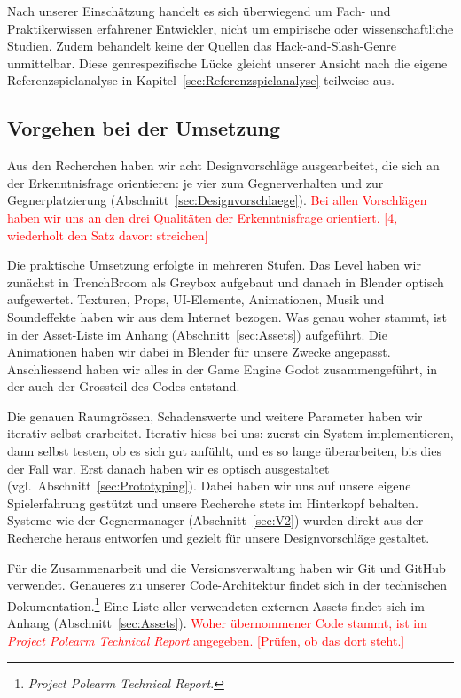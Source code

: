 \documentclass[../Main.tex]{subfiles}
\begin{document}
Nach unserer Einschätzung handelt es sich überwiegend um Fach- und Praktikerwissen erfahrener Entwickler, nicht um empirische oder wissenschaftliche Studien. Zudem behandelt keine der Quellen das Hack-and-Slash-Genre unmittelbar. Diese genrespezifische Lücke gleicht unserer Ansicht nach die eigene Referenzspielanalyse in Kapitel~\ref{sec:Referenzspielanalyse} teilweise aus.

\subsection{Vorgehen bei der Umsetzung} \label{sec:VorgehenUmsetzung}
Aus den Recherchen haben wir acht Designvorschläge ausgearbeitet, die sich an der Erkenntnisfrage orientieren: je vier zum Gegnerverhalten und zur Gegnerplatzierung (Abschnitt~\ref{sec:Designvorschlaege}). \textcolor{red}{Bei allen Vorschlägen haben wir uns an den drei Qualitäten der Erkenntnisfrage orientiert. [4, wiederholt den Satz davor: streichen]}

Die praktische Umsetzung erfolgte in mehreren Stufen. Das Level haben wir zunächst in TrenchBroom als Greybox aufgebaut und danach in Blender optisch aufgewertet. Texturen, Props, UI-Elemente, Animationen, Musik und Soundeffekte haben wir aus dem Internet bezogen. Was genau woher stammt, ist in der Asset-Liste im Anhang (Abschnitt~\ref{sec:Assets}) aufgeführt. Die Animationen haben wir dabei in Blender für unsere Zwecke angepasst. Anschliessend haben wir alles in der Game Engine Godot zusammengeführt, in der auch der Grossteil des Codes entstand.

Die genauen Raumgrössen, Schadenswerte und weitere Parameter haben wir iterativ selbst erarbeitet. Iterativ hiess bei uns: zuerst ein System implementieren, dann selbst testen, ob es sich gut anfühlt, und es so lange überarbeiten, bis dies der Fall war. Erst danach haben wir es optisch ausgestaltet (vgl.\ Abschnitt~\ref{sec:Prototyping}). Dabei haben wir uns auf unsere eigene Spielerfahrung gestützt und unsere Recherche stets im Hinterkopf behalten. Systeme wie der Gegnermanager (Abschnitt~\ref{sec:V2}) wurden direkt aus der Recherche heraus entworfen und gezielt für unsere Designvorschläge gestaltet.

Für die Zusammenarbeit und die Versionsverwaltung haben wir Git und GitHub verwendet. Genaueres zu unserer Code-Architektur findet sich in der technischen Dokumentation.\footnote{\textit{Project Polearm Technical Report}.} Eine Liste aller verwendeten externen Assets findet sich im Anhang (Abschnitt~\ref{sec:Assets}). \textcolor{red}{Woher übernommener Code stammt, ist im \textit{Project Polearm Technical Report} angegeben. [Prüfen, ob das dort steht.]}
\end{document}
